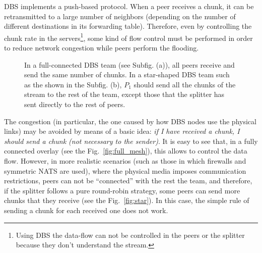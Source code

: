 
\label{sec:chunk_flooding}

\begin{comment}
\begin{figure*}
  \imgw{300}{graphics/peer_chunk_flooding.svg}
  \caption{Chunk flooding at peers.\label{fig:peer_chunk_flooding}}
\end{figure*}
\end{comment}

DBS implements a push-based protocol. When a peer receives a chunk, it
can be retransmitted to a large number of neighbors (depending on the
number of different destinations in its forwarding table). Therefore,
even by controlling the chunk rate in the servers\footnote{Using DBS
  the data-flow can not be controlled in the peers or the splitter
  because they don't understand the stream.}, some kind of flow
control must be performed in order to reduce network congestion while
peers perform the flooding.


\begin{figure*}
  \centering
  \quad
  \caption{In a full-connected DBS team (see Subfig. (a)), all peers
    receive and send the same number of chunks. In a star-shaped DBS
    team such as the shown in the Subfig. (b), $P_1$ should send all
    the chunks of the stream to the rest of the team, except those
    that the splitter has sent directly to the rest of peers.}
\end{figure*}

The congestion (in particular, the one caused by how DBS nodes use the
physical links) may be avoided by means of a basic idea: \textit{if I
have received a chunk, I should send a chunk (not necessary to the
sender)}. It is easy to see that, in a fully connected overlay (see
the Fig.~\ref{fig:full_mesh}), this allows to control the data
flow. However, in more realistic scenarios (such as those in which
firewalls and symmetric NATS are used), where the physical media
imposes communication restrictions, peers can not be ``connected''
with the rest the team, and therefore, if the splitter follows a pure
round-robin strategy, some peers can send more chunks that they
receive (see the Fig.~\ref{fig:star}). In this case, the simple rule
of sending a chunk for each received one does not work.

